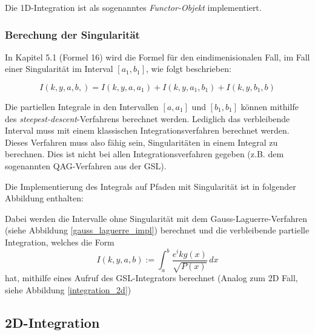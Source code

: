 Die 1D-Integration ist als sogenanntes \textit{Functor-Objekt} implementiert. 

\begin{center}
    
\end{center}

\subsubsection*{Berechung der Singularität}

In Kapitel 5.1 \cite[12]{gasperini:hal-03209144} (Formel 16) wird die Formel für den eindimenisionalen Fall, im Fall einer Singularität im Interval $[a_1, b_1]$, wie folgt beschrieben:

\begin{equation}
    I(k,y,a,b,) = I(k,y,a,a_1) + I(k,y,a_1, b_1) + I(k,y,b_1,b)
\end{equation}

Die partiellen Integrale in den Intervallen $[a,a_1]$ und  $[b_1,b_1]$ können mithilfe des \textit{steepest-descent}-Verfahrens berechnet werden.
Lediglich das verbleibende Interval muss mit einem klassischen Integrationsverfahren berechnet werden.
Dieses Verfahren muss also fähig sein, Singularitäten in einem Integral zu berechnen. Dies ist nicht bei allen Integrationsverfahren gegeben (z.B. dem sogenannten QAG-Verfahren aus der GSL).

Die Implementierung des Integrals auf Pfaden mit Singularität ist in folgender Abbildung enthalten:
\begin{center}
    
\end{center}

Dabei werden die Intervalle ohne Singularität mit dem Gauss-Laguerre-Verfahren (siehe Abbildung \ref{gauss_laguerre_impl}) berechnet und die verbleibende partielle Integration,
welches die Form
\begin{equation*}
    I(k,y,a,b) := \int_{a}^{b}  \frac{e^ikg(x)}{\sqrt{P(x)}} \,dx 
\end{equation*}
hat, mithilfe eines Aufruf des GSL-Integrators berechnet (Analog zum 2D Fall, siehe Abbildung \ref{integration_2d})



\subsection{2D-Integration}\label{2dint}

